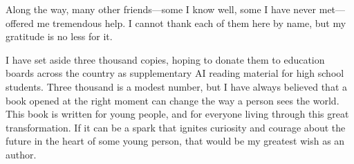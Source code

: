 Along the way, many other friends---some I know well, some I have never met---offered me tremendous help. I cannot thank each of them here by name, but my gratitude is no less for it.
\vspace{1em}

I have set aside three thousand copies, hoping to donate them to education boards across the country as supplementary AI reading material for high school students. Three thousand is a modest number, but I have always believed that a book opened at the right moment can change the way a person sees the world. This book is written for young people, and for everyone living through this great transformation. If it can be a spark that ignites curiosity and courage about the future in the heart of some young person, that would be my greatest wish as an author.

